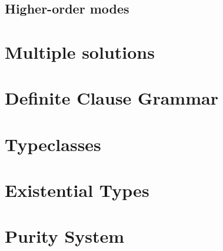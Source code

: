 \subsection{Higher-order modes}

\section{Multiple solutions}

\section{Definite Clause Grammar}

\section{Typeclasses}

\section{Existential Types}

\section{Purity System}



